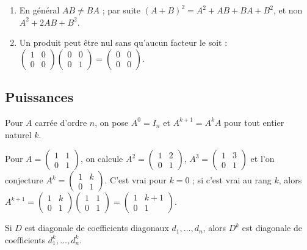\begin{pitfall}
\begin{enumerate}
\item En général $AB\neq BA$ ; par suite $(A+B)^2=A^2+AB+BA+B^2$, et non $A^2+2AB+B^2$.
\item Un produit peut être nul sans qu'aucun facteur le soit : $\begin{pmatrix}1&0\\0&0\end{pmatrix}\begin{pmatrix}0&0\\0&1\end{pmatrix}=\begin{pmatrix}0&0\\0&0\end{pmatrix}$.
\end{enumerate}
\end{pitfall}

\subsection{Puissances}
\begin{definition}
Pour $A$ carrée d'ordre $n$, on pose $A^0=I_n$ et $A^{k+1}=A^kA$ pour tout entier naturel $k$.
\end{definition}
\begin{method}
Pour $A=\begin{pmatrix}1&1\\0&1\end{pmatrix}$, on calcule $A^2=\begin{pmatrix}1&2\\0&1\end{pmatrix}$, $A^3=\begin{pmatrix}1&3\\0&1\end{pmatrix}$ et l'on conjecture $A^k=\begin{pmatrix}1&k\\0&1\end{pmatrix}$. C'est vrai pour $k=0$ ; si c'est vrai au rang $k$, alors $A^{k+1}=\begin{pmatrix}1&k\\0&1\end{pmatrix}\begin{pmatrix}1&1\\0&1\end{pmatrix}=\begin{pmatrix}1&k+1\\0&1\end{pmatrix}$.
\end{method}
\begin{keypoint}
Si $D$ est diagonale de coefficients diagonaux $d_1,\dots,d_n$, alors $D^k$ est diagonale de coefficients $d_1^k,\dots,d_n^k$.
\end{keypoint}

